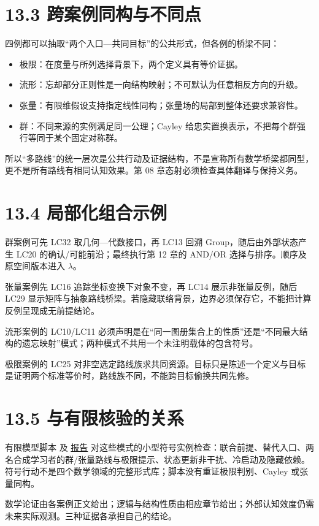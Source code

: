 \documentclass[UTF8,a4paper,zihao=-4,fontset=windows,openany]{ctexbook}
\begin{document}
\section{13.3 跨案例同构与不同点}
四例都可以抽取“两个入口—共同目标”的公共形式，但各例的桥梁不同：

\begin{itemize}
\item 极限：在度量与所列选择背景下，两个定义具有等价证据。
\item 流形：忘却部分正则性是一向结构映射；不可默认为任意相反方向的升级。
\item 张量：有限维假设支持指定线性同构；张量场的局部到整体还要求兼容性。
\item 群：不同来源的实例满足同一公理；Cayley 给忠实置换表示，不把每个群强行等同于某个固定对称群。
\end{itemize}
所以“多路线”的统一层次是公共行动及证据结构，不是宣称所有数学桥梁都同型，更不是所有路线有相同认知效果。第 08 章态射必须检查具体翻译与保持义务。

\section{13.4 局部化组合示例}
群案例可先 LC32 取几何—代数接口，再 LC13 回溯 Group，随后由外部状态产生 LC20 的确认/可能前沿；最终执行第 12 章的 AND/OR 选择与排序。顺序及原空间版本进入 \(\lambda\)。

张量案例先 LC16 追踪坐标变换下对象不变，再 LC14 展示非张量反例，随后 LC29 显示矩阵与抽象路线桥梁。若隐藏联络背景，边界必须保存它，不能把计算反例呈现成无前提结论。

流形案例的 LC10/LC11 必须声明是在“同一图册集合上的性质”还是“不同最大结构的遗忘映射”模式；两种模式不共用一个未注明载体的包含符号。

极限案例的 LC25 对非空选定路线族求共同资源。目标只是陈述一个定义与目标是证明两个标准等价时，路线族不同，不能跨目标偷换共同先修。

\section{13.5 与有限核验的关系}
有限模型脚本 及 \hyperref[mcs-source-27]{报告} 对这些模式的小型符号实例检查：联合前提、替代入口、两名合成学习者的群/张量路线与极限提示、状态更新非干扰、冷启动及隐藏依赖。符号行动不是四个数学领域的完整形式库；脚本没有重证极限判别、Cayley 或张量同构。

数学论证由各案例正文给出；逻辑与结构性质由相应章节给出；外部认知效度仍需未来实际观测。三种证据各承担自己的结论。
\end{document}
